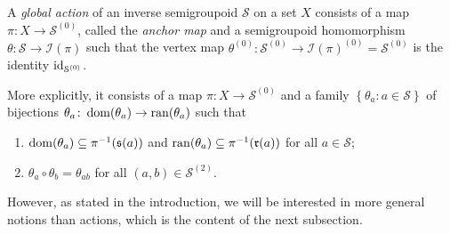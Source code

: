 \begin{definition}\label{def:action}
A \emph{global action} of an inverse semigroupoid $\mathcal{S}$ on a set $X$ consists of a map $\pi\colon X\to\mathcal{S}^{(0)}$, called the \emph{anchor map} and a semigroupoid homomorphism $\theta\colon\mathcal{S}\to\mathcal{I}(\pi)$ such that the vertex map $\theta^{(0)}
\colon\mathcal{S}^{(0)}\to\mathcal{I}(\pi)^{(0)}=\mathcal{S}^{(0)}$ is the identity $\operatorname{id}_{\mathcal{S}^{(0)}}$.

More explicitly, it consists of a map $\pi\colon X\to\mathcal{S}^{(0)}$ and a family $\left\{\theta_a:a\in\mathcal{S}\right\}$ of bijections $\theta_a\colon\operatorname{dom}(\theta_a)\to\operatorname{ran}(\theta_a)$ such that
\begin{enumerate}[label=(\roman*)]
    \item $\operatorname{dom}(\theta_a)\subseteq\pi^{-1}(\operatorname{\mathfrak{s}}(a))$ and $\operatorname{ran}(\theta_a)\subseteq\pi^{-1}(\operatorname{\mathfrak{r}}(a))$ for all $a\in\mathcal{S}$;
    \item $\theta_{a}\circ\theta_b=\theta_{ab}$ for all $(a,b)\in\mathcal{S}^{(2)}$.
\end{enumerate}
\end{definition}

However, as stated in the introduction, we will be interested in more general notions than actions, which is the content of the next subsection.